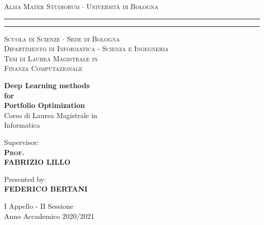 \begin{titlepage}
\begin{center}
    {{\Large{\textsc{Alma Mater Studiorum $\cdot$ Universit\`a di
    Bologna}}}} \rule[0.1cm]{15.8cm}{0.1mm}
    \rule[0.5cm]{15.8cm}{0.6mm}
    {\small{\textsc { Scuola di Scienze $\cdot$ Sede di Bologna\\
    Dipartimento di Informatica - Scienza e Ingegneria \\
    \vspace{5mm}
    Tesi di Laurea Magistrale in 
    \\ Finanza Computazionale}}}
\end{center}
\vspace{10mm}
\begin{center}
    {\LARGE\textbf{Deep Learning methods}}\\
    \vspace{3mm}
    {\LARGE\textbf{for}}\\
    \vspace{4mm}
    {\LARGE\textbf{Portfolio Optimization}}\\
    \vspace{3mm}
    \vspace{10mm} {\large{\sc Corso di Laurea Magistrale in \\
    Informatica}}
\end{center}
\vfill
\par
\noindent
\begin{minipage}[t]{0.47\textwidth}
    {\large{\sc Supervisor:}\\
    {\bf \textsc{Prof. \\
     FABRIZIO LILLO}}}\\
\end{minipage}
\hfill
\begin{minipage}[t]{0.47\textwidth}\raggedleft
    {\large{\sc Presented by:}\\
    \vspace{2mm}
    {\bf FEDERICO BERTANI}}
\end{minipage}
\vspace{20mm}
\begin{center}
    {\large{\sc I Appello - II Sessione\\%
    Anno Accademico 2020/2021}}%
\end{center}
\end{titlepage}
\restoregeometry